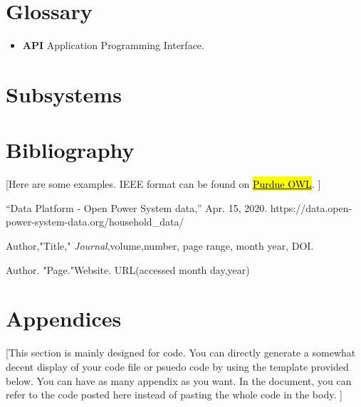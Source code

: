 \documentclass[letterpaper, 11pt]{article}
\begin{document}
\clearpage
\section*{Glossary} %
\begin{itemize}
    \item \textbf{API} Application Programming Interface.
\end{itemize}




\section{Subsystems}








\clearpage
\section{Bibliography}

 [Here are some examples. IEEE format can be found on \href{https://owl.purdue.edu/owl/research_and_citation/ieee_style/ieee_overview.html}{\hl{Purdue OWL}}. ]

\begin{thebibliography}{}

    “Data Platform - Open Power System data,” Apr. 15, 2020. https://data.open-power-system-data.org/household\_data/

    Author,"Title," \emph{Journal},volume,number, page range, month year, DOI.

    Author. "Page."Website. URL(accessed month day,year)

\end{thebibliography}

\clearpage
\section{Appendices}
 [This section is mainly designed for code.
  You can directly generate a somewhat decent display
  of your code file or psuedo code by using the template provided below. You can have as many appendix as you want. In the document, you can refer to the code posted here instead of pasting the whole code in the body. ]


\end{document}
